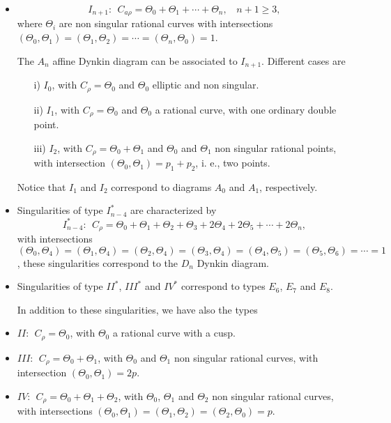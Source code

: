 \begin{itemize}

	\item \begin{equation}
I_{n+1}: \: \: C_{a\rho} = \Theta_0+\Theta_1+ \cdots + \Theta_n,
\: \: \: \: n+1 \geq 3,
\label{eq:K1}
\end{equation}
where $\Theta_i$ are non singular rational curves with intersections
$(\Theta_0,\Theta_1)=(\Theta_1,\Theta_2)=\cdots=(\Theta_n,\Theta_0)=1$. 
  
The $A_{n}$ affine Dynkin diagram can be associated to $I_{n+1}$.
Different cases are 
\begin{itemize}
	\item[{i)}] $I_0$, with $C_{\rho}=\Theta_0$ and $\Theta_0$
elliptic and non singular.
	\item[{ii)}] $I_1$, with $C_{\rho}=\Theta_0$ and $\Theta_0$ a
rational curve, with one ordinary double point.
	\item[{iii)}] $I_2$, with $C_{\rho}=\Theta_0+\Theta_1$ and
$\Theta_0$ and $\Theta_1$ non singular rational points, with
intersection $(\Theta_0,\Theta_1)=p_1+p_2$, i. e., two points.
\end{itemize}
Notice that $I_1$ and $I_2$ correspond to diagrams $A_0$ and
$A_1$, respectively.
  
	\item Singularities of type $I_{n-4}^*$ are characterized by
\begin{equation}
I_{n-4}^*: \: \: C_{\rho} = \Theta_0 + \Theta_1 + \Theta_2 +
\Theta_3 + 2 \Theta_4 + 2 \Theta_5 + \cdots + 2 \Theta_n,
\label{eq:K2}
\end{equation}
with intersections $(\Theta_0,\Theta_4)=(\Theta_1,\Theta_4)= 
(\Theta_2,\Theta_4)=(\Theta_3,\Theta_4)=(\Theta_4,\Theta_5)=
(\Theta_5,\Theta_6)= \cdots =1$, these singularities correspond to the $D_n$
Dynkin diagram.
  
	\item Singularities of type $II^*$, $III^*$ and $IV^*$ correspond to
types $E_6$, $E_7$ and $E_8$. 
  
In addition to these singularities,
we have also the types
	\item $II: \: \: C_{\rho} = \Theta_0$, with $\Theta_0$ a
rational curve with a cusp.
	\item $III: \: \: C_{\rho} = \Theta_0 + \Theta_1$, with
$\Theta_0$ and $\Theta_1$ non singular rational curves, with
intersection $(\Theta_0,\Theta_1)=2p$.
	\item $IV: \: \: C_{\rho} = \Theta_0 + \Theta_1 +
\Theta_2$, with $\Theta_0$, $\Theta_1$ and $\Theta_2$ non
singular rational curves, with intersections $(\Theta_0,\Theta_1)=
(\Theta_1,\Theta_2)=(\Theta_2,\Theta_0)=p$.
\end{itemize}

